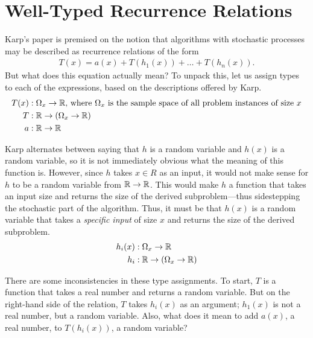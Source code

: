 \section{Well-Typed Recurrence Relations}
Karp's paper is premised on the notion that algorithms with stochastic processes may be described as 
recurrence relations of the form
\begin{align*}
T(x) = a(x) + T(h_1(x)) + \dots + T(h_n(x)).
\end{align*}
But what does this equation actually mean? To unpack this, let us assign types to each of the expressions,
based on the descriptions offered by Karp. 
\begin{align*}
T(x) &: \Omega_x \rightarrow \mathbb{R} \text{, where } \Omega_x \text{ is the sample space of all problem instances of size } x \\
T &: \mathbb{R} \rightarrow (\Omega_x \rightarrow \mathbb{R}) \\ 
a &: \mathbb{R} \rightarrow \mathbb{R}
\end{align*}

Karp alternates between saying that $h$ is a random variable and $h(x)$ is a random variable, so it is not immediately obvious 
what the meaning of this function is. However, since $h$ takes $x \in R$ as an input, it would not make sense for $h$ to be a 
random variable from $\mathbb{R} \rightarrow \mathbb{R}$. This would make $h$ a function that takes an input size and returns the 
size of the derived subproblem---thus sidestepping the stochastic part of the algorithm. Thus, it must be that $h(x)$ is a random
variable that takes a \emph{specific input} of size $x$ and returns the size of the derived subproblem.
\begin{align*}
h_i(x) &: \Omega_x \rightarrow \mathbb{R} \\
h_i &: \mathbb{R} \rightarrow (\Omega_x \rightarrow \mathbb{R}) 
\end{align*} 

There are some inconsistencies in these type assignments. To start, $T$ is a function that takes a real number and 
returns a random variable. But on the right-hand side of the relation, $T$ takes $h_i(x)$ as an argument; $h_1(x)$ is
not a real number, but a random variable. Also, what does it mean to add $a(x)$, a real number, to $T(h_i(x))$, 
a random variable? 